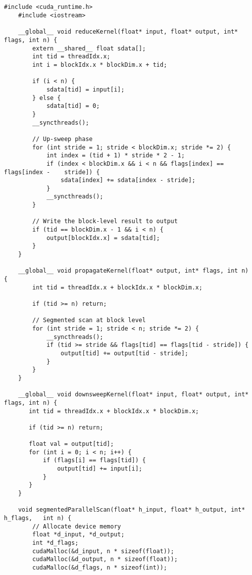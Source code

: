 \documentclass{article}
\begin{document}
\subsection{}
\begin{lstlisting}[basicstyle=\small\ttfamily, breaklines=true]
    #include <cuda_runtime.h>
    #include <iostream>

    __global__ void reduceKernel(float* input, float* output, int* flags, int n) {
        extern __shared__ float sdata[];
        int tid = threadIdx.x;
        int i = blockIdx.x * blockDim.x + tid;

        if (i < n) {
            sdata[tid] = input[i];
        } else {
            sdata[tid] = 0;
        }
        __syncthreads();

        // Up-sweep phase
        for (int stride = 1; stride < blockDim.x; stride *= 2) {
            int index = (tid + 1) * stride * 2 - 1;
            if (index < blockDim.x && i < n && flags[index] == flags[index -    stride]) {
                sdata[index] += sdata[index - stride];
            }
            __syncthreads();
        }

        // Write the block-level result to output
        if (tid == blockDim.x - 1 && i < n) {
            output[blockIdx.x] = sdata[tid];
        }
    }

    __global__ void propagateKernel(float* output, int* flags, int n) {
        int tid = threadIdx.x + blockIdx.x * blockDim.x;

        if (tid >= n) return;

        // Segmented scan at block level
        for (int stride = 1; stride < n; stride *= 2) {
            __syncthreads();
            if (tid >= stride && flags[tid] == flags[tid - stride]) {
                output[tid] += output[tid - stride];
            }
        }
    }

    __global__ void downsweepKernel(float* input, float* output, int* flags, int n) {
       int tid = threadIdx.x + blockIdx.x * blockDim.x;

       if (tid >= n) return;

       float val = output[tid];
       for (int i = 0; i < n; i++) {
           if (flags[i] == flags[tid]) {
               output[tid] += input[i];
           }
       }
    }
    
    void segmentedParallelScan(float* h_input, float* h_output, int* h_flags,   int n) {
        // Allocate device memory
        float *d_input, *d_output;
        int *d_flags;
        cudaMalloc(&d_input, n * sizeof(float));
        cudaMalloc(&d_output, n * sizeof(float));
        cudaMalloc(&d_flags, n * sizeof(int));


\end{lstlisting}
\end{document}

